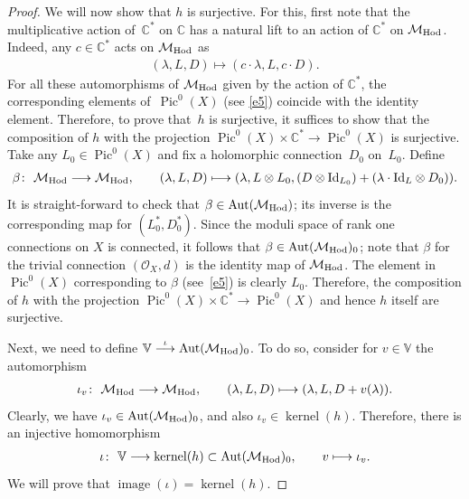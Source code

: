 \begin{proof}
We will now show that $h$ is surjective. For this, f\/irst note that the multiplicative action of~${\mathbb C}^*$ on $\mathbb C$ has a natural lift to an action of ${\mathbb C}^*$ on ${\mathcal M}_{\rm Hod}$. Indeed, any $c \in {\mathbb C}^*$ acts on ${\mathcal M}_{\rm Hod}$ as
\begin{gather*}
(\lambda, L, D) \longmapsto (c\cdot\lambda, L, c\cdot D) .
\end{gather*}
For all these automorphisms of ${\mathcal M}_{\rm Hod}$ given by the action of ${\mathbb C}^*$, the corresponding elements of~$\operatorname{Pic}^0(X)$ (see \eqref{e5}) coincide with the identity element. Therefore, to prove that~$h$ is surjective, it suf\/f\/ices to show that the composition of $h$ with the projection $\operatorname{Pic}^0(X)\times {\mathbb C}^*  \longrightarrow \operatorname{Pic}^0(X)$ is surjective. Take any $L_0 \in \operatorname{Pic}^0(X)$ and f\/ix a holomorphic connection~$D_0$ on~$L_0$. Def\/ine
\begin{gather*}
\beta \colon \  {\mathcal M}_{\rm Hod} \longrightarrow {\mathcal M}_{\rm Hod} ,\qquad
(\lambda, L, D) \longmapsto (\lambda, L\otimes L_0, (D\otimes \text{Id}_{L_0}) +(\lambda\cdot \text{Id}_L\otimes D_0)) .
\end{gather*}
It is straight-forward to check that $\beta \in \operatorname{Aut}({\mathcal M}_{\rm Hod})$; its inverse is the corresponding map for $(L_0^*, D_0^*)$. Since the moduli space of rank one connections on $X$ is connected, it follows that $\beta \in \operatorname{Aut}({\mathcal M}_{\rm Hod})_0$; note that $\beta$ for the trivial connection $({\mathcal O}_X, d)$ is the identity map of ${\mathcal M}_{\rm Hod}$. The element in $\operatorname{Pic}^0(X)$ corresponding to $\beta$ (see~\eqref{e5}) is clearly $L_0$. Therefore, the composition of $h$ with the projection $\operatorname{Pic}^0(X)\times {\mathbb C}^*  \longrightarrow \operatorname{Pic}^0(X)$ and hence $h$ itself are surjective.

Next, we need to def\/ine ${\mathbb V} \stackrel{\iota}{\longrightarrow} \operatorname{Aut}({\mathcal M}_{\rm Hod})_0$. To do so, consider for $v \in \mathbb V$ the automorphism
\begin{gather}\label{e6}
\iota_v \colon \ {\mathcal M}_{\rm Hod} \longrightarrow {\mathcal M}_{\rm Hod} ,\qquad (\lambda, L, D) \longmapsto (\lambda, L, D+v(\lambda)) .
\end{gather}
Clearly, we have $\iota_v \in \operatorname{Aut}({\mathcal M}_{\rm Hod})_0$, and also $\iota_v \in \operatorname{kernel}(h)$. Therefore, there is an injective homomorphism
\begin{gather*}
\iota \colon \ {\mathbb V} \longrightarrow \operatorname{kernel}(h) \subset \operatorname{Aut}({\mathcal M}_{\rm Hod})_0 ,\qquad v \longmapsto \iota_v .
\end{gather*}
We will prove that $\operatorname{image}(\iota) = \operatorname{kernel}(h)$.


\end{proof}
